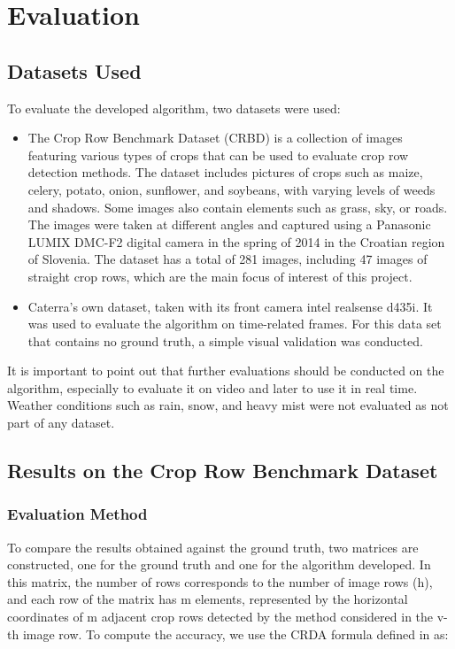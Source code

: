 \chapter{Evaluation}

\section{Datasets Used}
\label{sec:gliederung}

To evaluate the developed algorithm, two datasets were used:

\begin{itemize}
  \item The Crop Row Benchmark Dataset (CRBD)  \cite{CRBD} is a collection of images featuring various types of crops that can be used to evaluate crop row detection methods. The dataset includes pictures of crops such as maize, celery, potato, onion, sunflower, and soybeans, with varying levels of weeds and shadows. Some images also contain elements such as grass, sky, or roads. The images were taken at different angles and captured using a Panasonic LUMIX DMC-F2 digital camera in the spring of 2014 in the Croatian region of Slovenia. The dataset has a total of 281 images, including 47 images of straight crop rows, which are the main focus of interest of this project.

  
  \item Caterra's own dataset, taken with its front camera intel realsense d435i. It was used to evaluate the algorithm on time-related frames. For this data set that contains no ground truth, a simple visual validation was conducted. 
\end{itemize}

It is important to point out that further evaluations should be conducted on the algorithm, especially to evaluate it on video and later to use it in real time. 
Weather conditions such as rain, snow, and heavy mist were not evaluated as not part of any dataset. 

\section{Results on the Crop Row Benchmark Dataset}
\label{sec:gliederung}

\subsection{Evaluation Method}
\label{sec:gliederung}

To compare the results obtained against the ground truth, two matrices are constructed, one for the ground truth and one for the algorithm developed. In this matrix, the number of rows corresponds to the number of image rows (h), and each row of the matrix has m elements, represented by the horizontal coordinates of m adjacent crop rows detected by the method considered in the v-th image row. 
To compute the accuracy, we use the CRDA formula defined in \cite{8730214} as:


